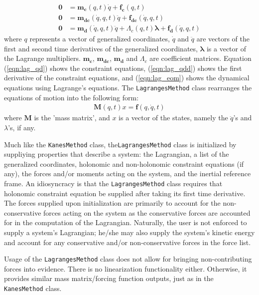 \documentclass[twocolumn,10pt, final]{asme2e}
\begin{document}
\begin{align}
    \mathbf{0} &= \mathbf{m_{c}}(q, t) \dot{q} + \mathbf{f_{c}}(q, t) \label{eqn:lag_qd}\\
    \mathbf{0} &= \mathbf{m_{dc}}(\dot{q}, q, t) \ddot{q} + \mathbf{f_{dc}}(\dot{q}, q,
        t) \label{eqn:lag_qdd}\\
    \mathbf{0} &= \mathbf{m_d}(\dot{q}, q, t) \ddot{q} + \Lambda_c(q, t)
        \mathbf{\lambda} + \mathbf{f_d}(\dot{q}, q, t) \label{eqn:lag_eom}
\end{align}
where $q$ represents a vector of generalized coordinates, $\dot{q}$ and
$\ddot{q}$ are vectors of the first and second time derivatives of the
generalized coordinates, $\mathbf{\lambda}$ is a vector of the Lagrange
multipliers. $\mathbf{m_c}$, $\mathbf{m_{dc}}$, $\mathbf{m_d}$ and
$\Lambda_c$ are coefficient matrices.
Equation (\ref{eqn:lag_qd}) shows the constraint equations,
(\ref{eqn:lag_qdd}) shows the
first derivative of the constraint equations, and (\ref{eqn:lag_eom}) shows
the dynamical equations using Lagrange's equations. The
\verb|LagrangesMethod| class rearranges the equations of motion into the
following form:
\label{eqn:lag_rearr}
\begin{align}
    \mathbf{M}(q, t) x = \mathbf{f}(q, \dot{q}, t)
\end{align}
where $\mathbf{M}$ is the 'mass matrix', and $x$ is a vector of the states,
namely the $\ddot{q}$'s and $\lambda$'s, if any.

Much like the \verb|KanesMethod| class, the\verb|LagrangesMethod| class is
initialized by suppliying properties that describe a system: the Lagrangian, a
list of the generalized coordinates, holonomic and non-holonomic constraint
equations (if any), the forces and/or moments acting on the system, and the
inertial reference frame. An idiosyncracy is that the \verb|LagrangesMethod|
class requires that holonomic constraint equation be supplied after taking its
first time derivative. The forces supplied upon initialization are primarily to
account for the non-conservative forces acting on the system as the conservative
forces are accounted for in the computation of the Lagrangian. Naturally, the
user is not enforced to supply a system's Lagrangian; he/she may also
supply the system's kinetic energy and account for any conservative and/or
non-conservative forces in the force list.

Usage of the \verb|LagrangesMethod| class does not allow for bringing
non-contributing forces into evidence. There is no linearization functionality
either. Otherwise, it provides similar mass matrix/forcing function outputs,
just as in the \verb|KanesMethod| class.
\end{document}

